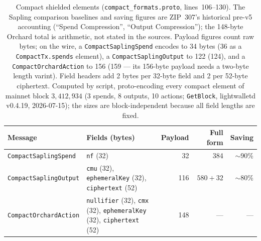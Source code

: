 \documentclass[11pt,a4paper]{article}
\theoremstyle{definition}
\begin{document}
\begin{table}[htbp]
\centering\footnotesize
\begin{tabular}{@{}lp{5.4cm}rrr@{}}
\toprule
Message & Fields (bytes) & Payload & Full form & Saving \\
\midrule
\texttt{CompactSaplingSpend} & \texttt{nf} (32) & 32 & 384 &
  $\sim$90\% \\
\texttt{CompactSaplingOutput} & \texttt{cmu} (32),
  \texttt{ephemeralKey} (32), \texttt{ciphertext} (52) & 116 & $580+32$ &
  $\sim$80\% \\
\texttt{CompactOrchardAction} & \texttt{nullifier} (32), \texttt{cmx} (32),
  \texttt{ephemeralKey} (32), \texttt{ciphertext} (52) & 148 & --- & --- \\
\bottomrule
\end{tabular}
\caption{Compact shielded elements (\texttt{compact\_formats.proto},
lines~106--130). The Sapling comparison baselines and saving figures are
ZIP~307's historical pre-v5 accounting
(``Spend Compression'', ``Output Compression''); the 148-byte Orchard total
is arithmetic, not stated in the sources. Payload figures count raw bytes;
on the wire, a \texttt{CompactSaplingSpend} encodes to 34 bytes (36 as a
\texttt{CompactTx.spends} element), a \texttt{CompactSaplingOutput} to 122
(124), and a \texttt{CompactOrchardAction} to 156 (159 --- its 156-byte
payload needs a two-byte length varint). Field headers add 2 bytes per
32-byte field and 2 per 52-byte ciphertext. Computed by script,
proto-encoding every compact element of mainnet block $3{,}412{,}934$ (3
spends, 8 outputs, 10 actions; \texttt{GetBlock}, lightwalletd v0.4.19,
2026-07-15); the sizes are block-independent because all field lengths are
fixed.}\label{tab:sync-compact-sizes}
\end{table}
\end{document}
